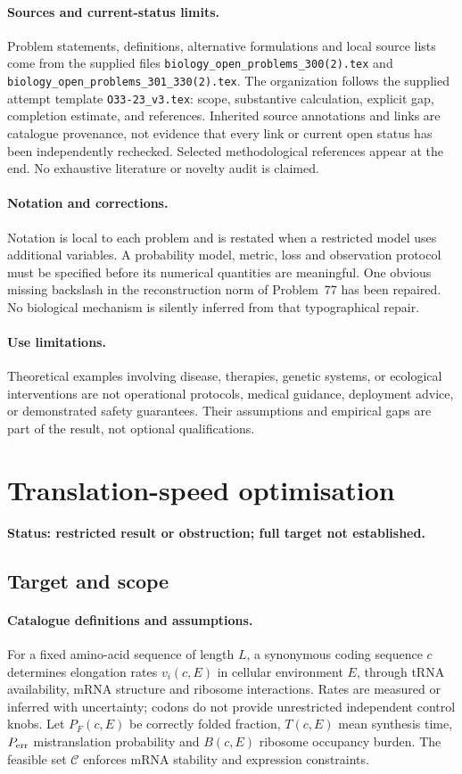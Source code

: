 \documentclass[11pt]{article}
\begin{document}
\paragraph{Sources and current-status limits.}
Problem statements, definitions, alternative formulations and local source lists
come from the supplied files
\texttt{biology\_open\_problems\_300(2).tex} and
\texttt{biology\_open\_problems\_301\_330(2).tex}.
The organization follows the supplied attempt template
\texttt{O33-23\_v3.tex}: scope, substantive calculation, explicit gap,
completion estimate, and references. Inherited source annotations and links are
catalogue provenance, not evidence that every link or current open status has
been independently rechecked. Selected methodological references appear at the
end. No exhaustive literature or novelty audit is claimed.

\paragraph{Notation and corrections.}
Notation is local to each problem and is restated when a restricted model uses
additional variables. A probability model, metric, loss and observation protocol
must be specified before its numerical quantities are meaningful. One obvious
missing backslash in the reconstruction norm of Problem~77 has been repaired.
No biological mechanism is silently inferred from that typographical repair.

\paragraph{Use limitations.}
Theoretical examples involving disease, therapies, genetic systems, or ecological
interventions are not operational protocols, medical guidance, deployment advice,
or demonstrated safety guarantees. Their assumptions and empirical gaps are part
of the result, not optional qualifications.


\section*{Translation-speed optimisation}
\label{prob:098}
\noindent\textbf{Status: restricted result or obstruction; full target not established.}
\subsection{Target and scope}
\paragraph{Catalogue definitions and assumptions.}
For a fixed amino-acid sequence of length $L$, a synonymous coding sequence $c$ determines elongation rates $v_i(c,E)$ in cellular environment $E$, through tRNA availability, mRNA structure and ribosome interactions. Rates are measured or inferred with uncertainty; codons do not provide unrestricted independent control knobs. Let $P_F(c,E)$ be correctly folded fraction, $T(c,E)$ mean synthesis time, $P_{
\rm err}$ mistranslation probability and $B(c,E)$ ribosome occupancy burden. The feasible set $\mathcal C$ enforces mRNA stability and expression constraints.
\end{document}
